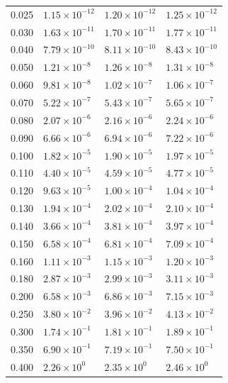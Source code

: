 \documentclass[onecolumn,notitlepage]{revtex4-1}
\begin{document}
\begin{table}[ht]
\begin{minipage}{0.45\linewidth}
\begin{tabular}{| c | l | l | l |}
0.025 & $1.15 \times 10^{-12}$ & $1.20 \times 10^{-12}$ & $1.25 \times 10^{-12}$ \\
0.030  & $1.63 \times 10^{-11}$ & $1.70 \times 10^{-11}$ & $1.77 \times 10^{-11}$ \\
0.040  & $7.79 \times 10^{-10}$ & $8.11 \times 10^{-10}$ & $8.43 \times 10^{-10}$ \\
0.050  & $1.21 \times 10^{-8}$  & $1.26 \times 10^{-8}$  & $1.31 \times 10^{-8}$ \\
0.060  & $9.81 \times 10^{-8}$  & $1.02 \times 10^{-7}$  & $1.06 \times 10^{-7}$  \\
0.070  & $5.22 \times 10^{-7}$  & $5.43 \times 10^{-7}$  & $5.65 \times 10^{-7}$  \\
0.080  & $2.07 \times 10^{-6}$  & $2.16 \times 10^{-6}$  & $2.24 \times 10^{-6}$  \\
0.090  & $6.66 \times 10^{-6}$  & $6.94 \times 10^{-6}$  & $7.22 \times 10^{-6}$  \\
0.100   & $1.82 \times 10^{-5}$  & $1.90 \times 10^{-5}$  & $1.97 \times 10^{-5}$  \\
0.110  & $4.40 \times 10^{-5}$  & $4.59 \times 10^{-5}$  & $4.77 \times 10^{-5}$  \\
0.120  & $9.63 \times 10^{-5}$  & $1.00 \times 10^{-4}$  & $1.04 \times 10^{-4}$  \\
0.130  & $1.94 \times 10^{-4}$  & $2.02 \times 10^{-4}$  & $2.10 \times 10^{-4}$  \\
0.140  & $3.66 \times 10^{-4}$  & $3.81 \times 10^{-4}$  & $3.97 \times 10^{-4}$  \\
0.150  & $6.58 \times 10^{-4}$  & $6.81 \times 10^{-4}$  & $7.09 \times 10^{-4}$  \\
0.160  & $1.11 \times 10^{-3}$  & $1.15 \times 10^{-3}$  & $1.20 \times 10^{-3}$  \\
0.180  & $2.87 \times 10^{-3}$  & $2.99 \times 10^{-3}$  & $3.11 \times 10^{-3}$  \\
0.200   & $6.58 \times 10^{-3}$  & $6.86 \times 10^{-3}$  & $7.15 \times 10^{-3}$  \\
0.250  & $3.80 \times 10^{-2}$  & $3.96 \times 10^{-2}$  & $4.13 \times 10^{-2}$  \\
0.300   & $1.74 \times 10^{-1}$  & $1.81 \times 10^{-1}$  & $1.89 \times 10^{-1}$  \\
0.350  & $6.90 \times 10^{-1}$  & $7.19 \times 10^{-1}$  & $7.50 \times 10^{-1}$  \\
0.400   & $2.26 \times 10^{0}$   & $2.35 \times 10^{0}$   & $2.46 \times 10^{0}$   \\

\end{tabular}
\end{minipage}
\end{table}
\end{document}
